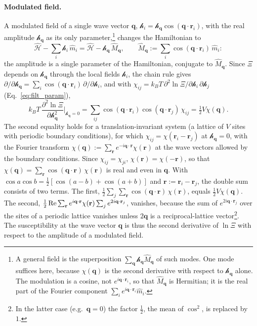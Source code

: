 \documentclass[10pt,a4paper]{article}
\theoremstyle{plain}
\newcommand{\hfield}{\mathscr{h}}  %
\begin{document}
\paragraph{Modulated field.} A modulated field of a single wave vector
$\mathbf q$, $\hfield_i=\hfield_{\mathbf q}\cos(\mathbf q\cdot\mathbf r_i)$,
with the real amplitude $\hfield_{\mathbf q}$ as its only
parameter,\footnote{A general field is the superposition
$\sum_{\mathbf q}\hfield_{\mathbf q}\hat M_{\mathbf q}$ of such modes. One
mode suffices here, because $\chi(\mathbf q)$ is the second derivative with
respect to $\hfield_{\mathbf q}$ alone. The modulation is a cosine, not
$e^{i\mathbf q\cdot\mathbf r_i}$, so that $\hat M_{\mathbf q}$ is Hermitian;
it is the real part of the Fourier component
$\sum_ie^{i\mathbf q\cdot\mathbf r_i}\hat m_i$.} changes the Hamiltonian to
\begin{equation}\label{eq:filt_Mq}
  \hat{\mathcal H}-\sum_i\hfield_i\,\hat m_i
  =\hat{\mathcal H}-\hfield_{\mathbf q}\,\hat M_{\mathbf q} ,
  \qquad
  \hat M_{\mathbf q}:=\sum_i\cos(\mathbf q\cdot\mathbf r_i)\,\hat m_i :
\end{equation}
the amplitude is a single parameter of the Hamiltonian, conjugate to
$\hat M_{\mathbf q}$. Since $\Xi$ depends on $\hfield_{\mathbf q}$ through
the local fields $\hfield_i$, the chain rule gives
$\partial/\partial\hfield_{\mathbf q}
=\sum_i\cos(\mathbf q\cdot\mathbf r_i)\,\partial/\partial\hfield_i$, and with
$\chi_{ij}=k_BT\,\partial^{2}\ln\Xi/\partial\hfield_i\,\partial\hfield_j$
(Eq.~\eqref{eq:filt_param}),
\begin{equation}\label{eq:filt_chiq_exact}
  k_BT\,\frac{\partial^{2}\ln\Xi}{\partial \hfield_{\mathbf q}^{2}}\bigg|_{\hfield_{\mathbf q}=0}
  =\sum_{ij}\cos(\mathbf q\cdot\mathbf r_i)\cos(\mathbf q\cdot\mathbf r_j)\,\chi_{ij}
  =\tfrac12V\chi(\mathbf q) .
\end{equation}
The second equality holds for a translation-invariant system (a lattice of
$V$ sites with periodic boundary conditions), for which
$\chi_{ij}=\chi(\mathbf r_i-\mathbf r_j)$ at $\hfield_{\mathbf q}=0$, with the
Fourier transform
$\chi(\mathbf q):=\sum_{\mathbf r}e^{-i\mathbf q\cdot\mathbf r}\chi(\mathbf r)$
at the wave vectors allowed by the boundary conditions. Since
$\chi_{ij}=\chi_{ji}$, $\chi(\mathbf r)=\chi(-\mathbf r)$, so that
$\chi(\mathbf q)=\sum_{\mathbf r}\cos(\mathbf q\cdot\mathbf r)\,\chi(\mathbf r)$
is real and even in $\mathbf q$. With
$\cos a\cos b=\tfrac12[\cos(a-b)+\cos(a+b)]$ and
$\mathbf r:=\mathbf r_i-\mathbf r_j$, the double sum consists of two terms.
The first,
$\tfrac12\sum_j\sum_{\mathbf r}\cos(\mathbf q\cdot\mathbf r)\,\chi(\mathbf r)$,
equals $\tfrac12V\chi(\mathbf q)$. The second,
$\tfrac12\,{\rm Re}\sum_{\mathbf r}e^{i\mathbf q\cdot\mathbf r}\chi(\mathbf r)
\sum_je^{2i\mathbf q\cdot\mathbf r_j}$,
vanishes, because the sum of $e^{2i\mathbf q\cdot\mathbf r_j}$ over the sites
of a periodic lattice vanishes unless $2\mathbf q$ is a reciprocal-lattice
vector\footnote{In the latter case (e.g.\ $\mathbf q=0$) the factor
$\tfrac12$, the mean of $\cos^{2}$, is replaced by $1$.}. The susceptibility
at the wave vector $\mathbf q$ is thus the second derivative of $\ln\Xi$ with
respect to the amplitude of a modulated field.
\end{document}
